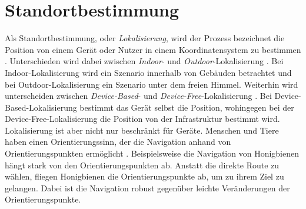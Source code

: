 \chapter{Standortbestimmung}
Als Standortbestimmung, oder \textit{Lokalisierung}, wird der Prozess bezeichnet die Position von einem Gerät oder Nutzer in einem Koordinatensystem zu bestimmen \cite{bulusu2000gps}.
Unterschieden wird dabei zwischen \textit{Indoor}- und \textit{Outdoor}-Lokalisierung \cite{zafari2019survey, bulusu2000gps}.
Bei Indoor-Lokalisierung wird ein Szenario innerhalb von Gebäuden betrachtet und bei Outdoor-Lokalisierung ein Szenario unter dem freien Himmel.
\newline
\newline
Weiterhin wird unterscheiden zwischen \textit{Device-Based}- und \textit{Device-Free}-Lokalisierung \cite{xiao2016survey}.
Bei Device-Based-Lokalisierung bestimmt das Gerät selbst die Position, wohingegen bei der Device-Free-Lokalisierung
die Position von der Infrastruktur bestimmt wird.
\newline
\newline
Lokalisierung ist aber nicht nur beschränkt für Geräte.
Menschen und Tiere haben einen Orientierungssinn, der die Navigation anhand von Orientierungspunkten ermöglicht \cite{menzel1996knowledge}.
Beispielsweise die Navigation von Honigbienen hängt stark von den Orientierungspunkten ab.
Anstatt die direkte Route zu wählen, fliegen Honigbienen die Orientierungspunkte ab, um zu ihrem Ziel zu gelangen.
Dabei ist die Navigation robust gegenüber leichte Veränderungen der Orientierungspunkte.

